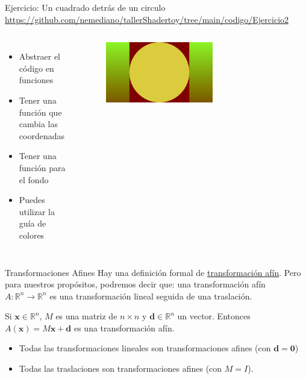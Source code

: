 \begin{frame}{Ejercicio: Un cuadrado detrás de un circulo}
\url{https://github.com/nemediano/tallerShadertoy/tree/main/codigo/Ejercicio2}
\begin{columns}
     \begin{itemize}
         \item Abstraer el código en funciones
         \item Tener una función que cambia las coordenadas
         \item Tener una función para el fondo
         \item Puedes utilizar la guía de colores
     \end{itemize}
        \begin{figure}[htb]
            \centering
            \includegraphics[width=0.6\textwidth]{img/Ejer2}
        \end{figure}
\end{columns}
\end{frame}

\begin{frame}{Transformaciones Afines}
Hay una definición formal de \href{https://en.wikipedia.org/wiki/Affine_transformation}{transformación afín}. Pero para nuestros propósitos, podremos decir que: una transformación afín $A: \mathbb{R}^n \rightarrow \mathbb{R}^n$ es una transformación lineal seguida de una traslación.

\begin{block}{}
    Si $\mathbf{x} \in \mathbb{R}^n$, $M$ es una matriz de $n \times n$ y $\mathbf{d} \in \mathbb{R}^n$ un vector.
    Entonces $A(\mathbf{x}) = M \mathbf{x} + \mathbf{d}$ es una transformación afín.
\end{block}
\begin{itemize}
    \item Todas las transformaciones lineales son transformaciones afines (con $\mathbf{d} = \mathbf{0}$)
    \item Todas las traslaciones son transformaciones afines (con $M = I$).
\end{itemize}
\end{frame}


